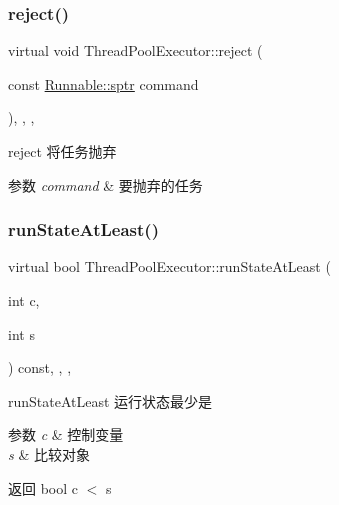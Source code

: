 \subsubsection{\texorpdfstring{reject()}{reject()}\hspace{0.1cm}{\footnotesize\ttfamily [2/2]}}
{\footnotesize\ttfamily virtual void Thread\+Pool\+Executor\+::reject (\begin{DoxyParamCaption}\item[{const \hyperlink{classRunnable_abe8d3066c7305401d6f0aad8e70780f2}{Runnable\+::sptr}}]{command }\end{DoxyParamCaption})\hspace{0.3cm}{\ttfamily [inline]}, {\ttfamily [final]}, {\ttfamily [protected]}, {\ttfamily [virtual]}}



reject 将任务抛弃 


\begin{DoxyParams}{参数}
{\em command} & 要抛弃的任务 \\
\hline
\end{DoxyParams}
\mbox{\label{classThreadPoolExecutor_a44ee48ed44faa12fc6373074e9059e4e}} 
\subsubsection{\texorpdfstring{run\+State\+At\+Least()}{runStateAtLeast()}}
{\footnotesize\ttfamily virtual bool Thread\+Pool\+Executor\+::run\+State\+At\+Least (\begin{DoxyParamCaption}\item[{int}]{c,  }\item[{int}]{s }\end{DoxyParamCaption}) const\hspace{0.3cm}{\ttfamily [inline]}, {\ttfamily [final]}, {\ttfamily [protected]}, {\ttfamily [virtual]}}



run\+State\+At\+Least 运行状态最少是 


\begin{DoxyParams}{参数}
{\em c} & 控制变量 \\
\hline
{\em s} & 比较对象\\
\hline
\end{DoxyParams}
\begin{DoxyReturn}{返回}
bool c $<$ s 
\end{DoxyReturn}
\mbox{\label{classThreadPoolExecutor_aa12a3efb879080453fb7abc486585698}} 
